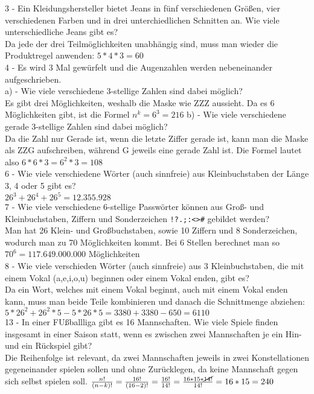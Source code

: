 \documentclass{article}
\begin{document}
	3 - Ein Kleidungshersteller bietet Jeans in fünf verschiedenen Größen, vier verschiedenen Farben und in drei unterchiedlichen Schnitten an. Wie viele unterschiedliche Jeans gibt es? \\
	Da jede der drei Teilmöglichkeiten unabhängig sind, muss man wieder die Produktregel anwenden: $5*4*3=60$ \\
	4 - Es wird 3 Mal gewürfelt und die Augenzahlen werden nebeneinander aufgeschrieben. \\
	a) - Wie viele verschiedene 3-stellige Zahlen sind dabei möglich? \\
	Es gibt drei Möglichkeiten, weshalb die Maske wie ZZZ aussieht. Da es 6 Möglichkeiten gibt, ist die Formel $n^k=6^3=216$
	b) - Wie viele verschiedene gerade 3-stellige Zahlen sind dabei möglich? \\
	Da die Zahl nur Gerade ist, wenn die letzte Ziffer gerade ist, kann man die Maske als ZZG aufschreiben, während G jeweils eine gerade Zahl ist. Die Formel lautet also $6*6*3=6^2*3=108$ \\
	6 - Wie viele verschiedene Wörter (auch sinnfreie) aus Kleinbuchstaben der Länge 3, 4 oder 5 gibt es? \\
	$26^3+26^4+26^5=12.355.928$ \\
	7 - Wie viele verschiedene 6-stellige Passwörter können aus Groß- und Kleinbuchstaben, Ziffern und Sonderzeichen \verb|!?.;:<>#| gebildet werden? \\
	Man hat 26 Klein- und Großbuchstaben, sowie 10 Ziffern und 8 Sonderzeichen, wodurch man zu 70 Möglichkeiten kommt. Bei 6 Stellen berechnet man so $70^6=117.649.000.000$ Möglichkeiten \\
	8 - Wie viele verschieden Wörter (auch sinnfreie) aus 3 Kleinbuchstaben, die mit einem Vokal (a,e,i,o,u) beginnen oder einem Vokal enden, gibt es? \\
	Da ein Wort, welches mit einem Vokal beginnt, auch mit einem Vokal enden kann, muss man beide Teile kombinieren und danach die Schnittmenge abziehen: $5*26^2+26^2*5-5*26*5=3380+3380-650=6110$ \\
	13 - In einer FUßballliga gibt es 16 Mannschaften. Wie viele Spiele finden insgesamt in einer Saison statt, wenn es zwischen zwei Mannschaften je ein Hin- und ein Rückspiel gibt? \\
	Die Reihenfolge ist relevant, da zwei Mannschaften jeweils in zwei Konstellationen gegeneinander spielen sollen und ohne Zurücklegen, da keine Mannschaft gegen sich selbst spielen soll. $\frac{n!}{(n-k)!}=\frac{16!}{(16-2)!}=\frac{16!}{14!}=\frac{16*15*\cancel{14!}}{14!}=16*15=240$ \\
\end{document}

